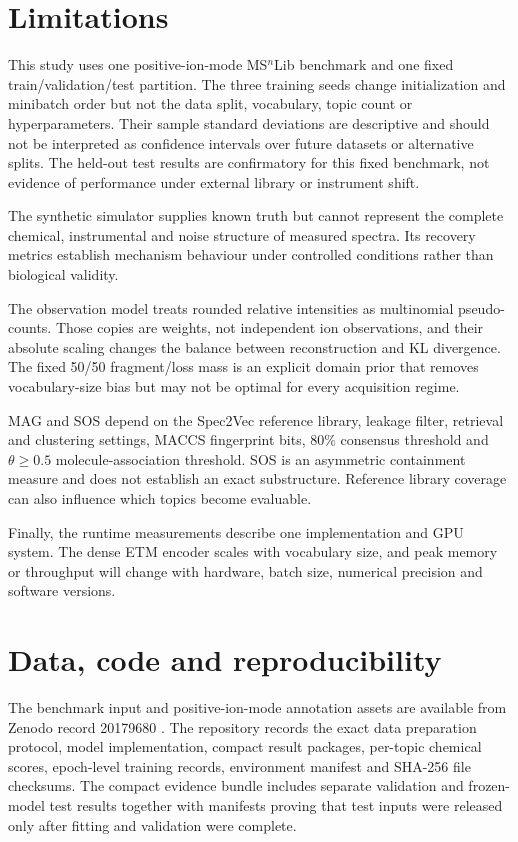 \documentclass[10pt,a4paper]{article}
\begin{document}
\section{Limitations}

This study uses one positive-ion-mode MS$^{n}$Lib benchmark and one fixed
train/validation/test partition. The
three training seeds change initialization and minibatch order but not the
data split, vocabulary, topic count or hyperparameters. Their sample standard
deviations are descriptive and should not be interpreted as confidence
intervals over future datasets or alternative splits. The held-out test results
are confirmatory for this fixed benchmark, not evidence of performance under
external library or instrument shift.

The synthetic simulator supplies known truth but cannot represent the complete
chemical, instrumental and noise structure of measured spectra. Its recovery
metrics establish mechanism behaviour under controlled conditions rather than
biological validity.

The observation model treats rounded relative intensities as multinomial
pseudo-counts. Those copies are weights, not independent ion observations, and
their absolute scaling changes the balance between reconstruction and KL
divergence. The fixed 50/50 fragment/loss mass is an explicit domain prior that removes
vocabulary-size bias but may not be optimal for every acquisition regime.

MAG and SOS depend on the Spec2Vec reference library, leakage filter, retrieval
and clustering settings, MACCS fingerprint bits, 80\% consensus threshold and
$\theta\geq0.5$ molecule-association threshold. SOS is an asymmetric
containment measure and does not establish an exact substructure. Reference
library coverage can also influence which topics become evaluable.

Finally, the runtime measurements describe one implementation and GPU system.
The dense ETM encoder scales with vocabulary size, and peak memory or throughput
will change with hardware, batch size, numerical precision and software
versions.

\section{Data, code and reproducibility}

The benchmark input and positive-ion-mode annotation assets are available from
Zenodo record 20179680 \cite{msnlibdata}. The repository records the exact data
preparation protocol, model implementation, compact result packages,
per-topic chemical scores, epoch-level training records, environment manifest and
SHA-256 file checksums. The compact evidence bundle includes separate validation
and frozen-model test results together with manifests proving that test inputs
were released only after fitting and validation were complete.
\end{document}
